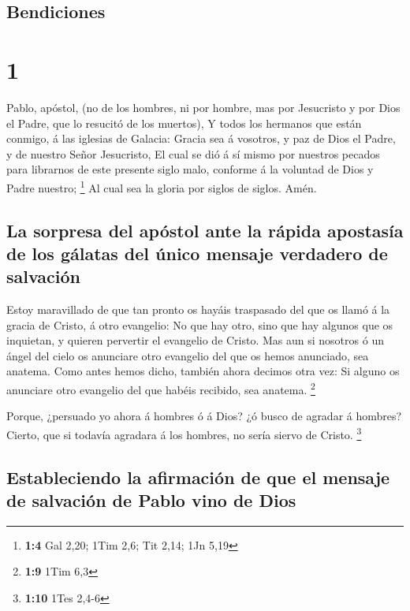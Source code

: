 \hypertarget{bendiciones}{%
\subsection{Bendiciones}\label{bendiciones}}

\hypertarget{section}{%
\section{1}\label{section}}

 Pablo, apóstol, (no de los hombres, ni por hombre, mas por
Jesucristo y por Dios el Padre, que lo resucitó de los muertos),
 Y todos los hermanos que están conmigo, á las iglesias de
Galacia:  Gracia sea á vosotros, y paz de Dios el Padre, y
de nuestro Señor Jesucristo,  El cual se dió á sí mismo por
nuestros pecados para librarnos de este presente siglo malo, conforme á
la voluntad de Dios y Padre nuestro; \footnote{\textbf{1:4} Gal 2,20;
  1Tim 2,6; Tit 2,14; 1Jn 5,19}  Al cual sea la gloria por
siglos de siglos. Amén.

\hypertarget{la-sorpresa-del-apuxf3stol-ante-la-ruxe1pida-apostasuxeda-de-los-guxe1latas-del-uxfanico-mensaje-verdadero-de-salvaciuxf3n}{%
\subsection{La sorpresa del apóstol ante la rápida apostasía de los
gálatas del único mensaje verdadero de
salvación}\label{la-sorpresa-del-apuxf3stol-ante-la-ruxe1pida-apostasuxeda-de-los-guxe1latas-del-uxfanico-mensaje-verdadero-de-salvaciuxf3n}}

 Estoy maravillado de que tan pronto os hayáis traspasado
del que os llamó á la gracia de Cristo, á otro evangelio: 
No que hay otro, sino que hay algunos que os inquietan, y quieren
pervertir el evangelio de Cristo.  Mas aun si nosotros ó un
ángel del cielo os anunciare otro evangelio del que os hemos anunciado,
sea anatema.  Como antes hemos dicho, también ahora decimos
otra vez: Si alguno os anunciare otro evangelio del que habéis recibido,
sea anatema. \footnote{\textbf{1:9} 1Tim 6,3}

 Porque, ¿persuado yo ahora á hombres ó á Dios? ¿ó busco de
agradar á hombres? Cierto, que si todavía agradara á los hombres, no
sería siervo de Cristo. \footnote{\textbf{1:10} 1Tes 2,4-6}

\hypertarget{estableciendo-la-afirmaciuxf3n-de-que-el-mensaje-de-salvaciuxf3n-de-pablo-vino-de-dios}{%
\subsection{Estableciendo la afirmación de que el mensaje de salvación
de Pablo vino de
Dios}\label{estableciendo-la-afirmaciuxf3n-de-que-el-mensaje-de-salvaciuxf3n-de-pablo-vino-de-dios}}

